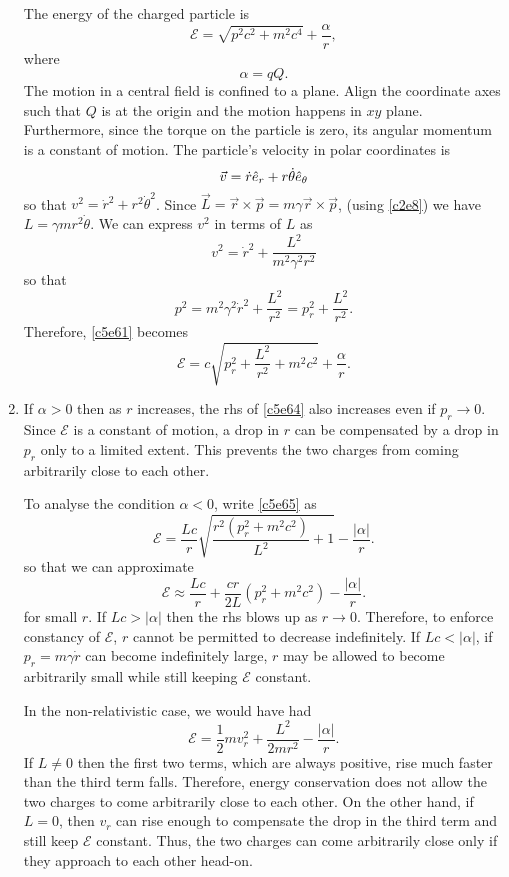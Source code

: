 \begin{enumerate}
The energy of the charged particle is
\begin{equation}\label{c5e61}
\mathcal{E} = \sqrt{p^2c^2 + m^2c^4} + \frac{\alpha}{r},
\end{equation}
where
\begin{equation}\label{c5e62}
\alpha = qQ.
\end{equation}
The motion in a central field is confined to a plane. Align the coordinate axes
such that $Q$ is at the origin and the motion happens in $xy$ plane. Furthermore,
since the torque on the particle is zero, its angular momentum is a constant of
motion. The particle's velocity in polar coordinates is
\begin{equation}\label{c5e63}
\vec{v} = \dot{r}\hat{e}_{r} + r\dot{\theta}\hat{e}_{\theta}
\end{equation}
so that $v^2 = \dot{r}^2 + r^2\dot{\theta}^2$. Since $\vec{L} = \vec{r} \times
\vec{p} = m\gamma\vec{r} \times \vec{p}$, (using \eqref{c2e8}) we have $L = 
\gamma mr^2\dot{\theta}$. We can express $v^2$ in terms of $L$ as
\[
v^2 = \dot{r}^2 + \frac{L^2}{m^2\gamma^2 r^2}
\]
so that
\begin{equation}\label{c5e64}
p^2 = m^2\gamma^2\dot{r}^2 + \frac{L^2}{r^2} = p_r^2 + \frac{L^2}{r^2}.
\end{equation}
Therefore, \eqref{c5e61} becomes
\begin{equation}\label{c5e65}
\mathcal{E} = c\sqrt{p_r^2 + \frac{L^2}{r^2} + m^2c^2} + \frac{\alpha}{r}.
\end{equation}

\item If $\alpha > 0$ then as $r$ increases, the rhs of \eqref{c5e64} also
increases even if $p_r \rightarrow 0$. Since $\mathcal{E}$ is a constant of
motion, a drop in $r$ can be compensated by a drop in $p_r$ only to a limited
extent. This prevents the two charges from coming arbitrarily close to each 
other.

To analyse the condition $\alpha < 0$, write \eqref{c5e65} as
\[
\mathcal{E} = \frac{Lc}{r}\sqrt{\frac{r^2(p_r^2 + m^2c^2)}{L^2} + 1} - \frac{|\alpha|}{r}.
\]
so that we can approximate
\[
\mathcal{E} \approx \frac{Lc}{r} + \frac{cr}{2L}(p_r^2 + m^2c^2) - \frac{|\alpha|}{r}.
\]
for small $r$. If $Lc > |\alpha|$ then the rhs blows up as $r \rightarrow 0$. 
Therefore, to enforce constancy of $\mathcal{E}$, $r$ cannot be permitted to
decrease indefinitely. If $Lc < |\alpha|$, if $p_r = m\gamma\dot{r}$ can become
indefinitely large, $r$ may be allowed to become arbitrarily small while still
keeping $\mathcal{E}$ constant.

In the non-relativistic case, we would have had
\[
\mathcal{E} = \frac{1}{2}mv_r^2 + \frac{L^2}{2mr^2} - \frac{|\alpha|}{r}.
\]
If $L \ne 0$ then the first two terms, which are always positive, rise much faster
than the third term falls. Therefore, energy conservation does not allow the two
charges to come arbitrarily close to each other. On the other hand, if $L = 0$, 
then $v_r$ can rise enough to compensate the drop in the third term and still
keep  $\mathcal{E}$ constant. Thus, the two charges can come arbitrarily close only
if they approach to each other head-on.
\end{enumerate}